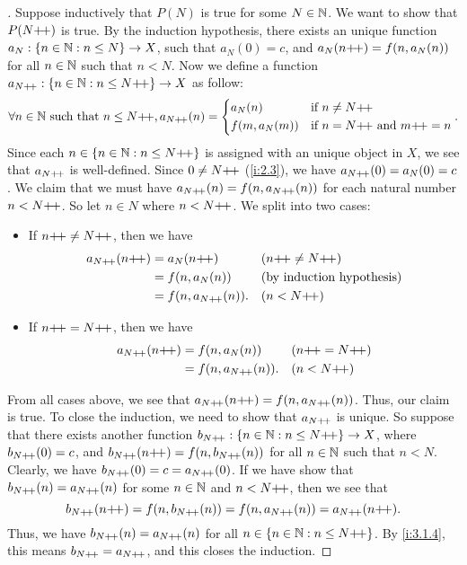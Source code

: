 \begin{proof}[]
  Suppose inductively that \(P(N)\) is true for some \(N \in \mathbb{N}\).
  We want to show that \(P(N{+}\!{+})\) is true.
  By the induction hypothesis, there exists an unique function \(a_N : \left\lbrace n \in \mathbb{N} : n \leq N\right\rbrace \to X\), such that \(a_N(0) = c\), and \(a_N(n{+}\!{+}) = f(n, a_N(n))\) for all \(n \in \mathbb{N}\) such that \(n < N\).
  Now we define a function \(a_{N{+}\!{+}} : \left\lbrace n \in \mathbb{N} : n \leq N{+}\!{+}\right\rbrace \to X\) as follow:
  \[
    \forall n \in \mathbb{N} \text{ such that } n \leq N{+}\!{+}, a_{N{+}\!{+}}(n) = \begin{dcases}
      a_N(n)       & \text{if } n \neq N{+}\!{+}                    \\
      f(m, a_N(m)) & \text{if } n = N{+}\!{+} \text{ and } m{+}\!{+} = n
    \end{dcases}.
  \]
  Since each \(n \in \left\lbrace n \in \mathbb{N} : n \leq N{+}\!{+}\right\rbrace\) is assigned with an unique object in \(X\), we see that \(a_{N{+}\!{+}}\) is well-defined.
  Since \(0 \neq N{+}\!{+}\) (\cref{i:2.3}), we have \(a_{N{+}\!{+}}(0) = a_N(0) = c\).
  We claim that we must have \(a_{N{+}\!{+}}(n) = f(n, a_{N{+}\!{+}}(n))\) for each natural number \(n < N{+}\!{+}\).
  So let \(n \in N\) where \(n < N{+}\!{+}\).
  We split into two cases:
  \begin{itemize}
    \item If \(n{+}\!{+} \neq N{+}\!{+}\), then we have
          \begin{align*}
            a_{N{+}\!{+}}(n{+}\!{+}) & = a_N(n{+}\!{+})          &  & (n{+}\!{+} \neq N{+}\!{+}) \\
                           & = f(n, a_N(n))       &  & \text{(by induction hypothesis)}            \\
                           & = f(n, a_{N{+}\!{+}}(n)). &  & (n < N{+}\!{+})
          \end{align*}
    \item If \(n{+}\!{+} = N{+}\!{+}\), then we have
          \begin{align*}
            a_{N{+}\!{+}}(n{+}\!{+}) & = f(n, a_N(n))       &  & (n{+}\!{+} = N{+}\!{+}) \\
                           & = f(n, a_{N{+}\!{+}}(n)). &  & (n < N{+}\!{+})
          \end{align*}
  \end{itemize}
  From all cases above, we see that \(a_{N{+}\!{+}}(n{+}\!{+}) = f(n, a_{N{+}\!{+}}(n))\).
  Thus, our claim is true.
  To close the induction, we need to show that \(a_{N{+}\!{+}}\) is unique.
  So suppose that there exists another function \(b_{N{+}\!{+}} : \left\lbrace n \in \mathbb{N} : n \leq N{+}\!{+}\right\rbrace \to X\), where \(b_{N{+}\!{+}}(0) = c\), and \(b_{N{+}\!{+}}(n{+}\!{+}) = f(n, b_{N{+}\!{+}}(n))\) for all \(n \in \mathbb{N}\) such that \(n < N\).
  Clearly, we have \(b_{N{+}\!{+}}(0) = c = a_{N{+}\!{+}}(0)\).
  If we have show that \(b_{N{+}\!{+}}(n) = a_{N{+}\!{+}}(n)\) for some \(n \in \mathbb{N}\) and \(n < N{+}\!{+}\), then we see that
  \[
    b_{N{+}\!{+}}(n{+}\!{+}) = f(n, b_{N{+}\!{+}}(n)) = f(n, a_{N{+}\!{+}}(n)) = a_{N{+}\!{+}}(n{+}\!{+}).
  \]
  Thus, we have \(b_{N{+}\!{+}}(n) = a_{N{+}\!{+}}(n)\) for all \(n \in \left\lbrace n \in \mathbb{N} : n \leq N{+}\!{+}\right\rbrace\).
  By \cref{i:3.1.4}, this means \(b_{N{+}\!{+}} = a_{N{+}\!{+}}\), and this closes the induction.


\end{proof}

